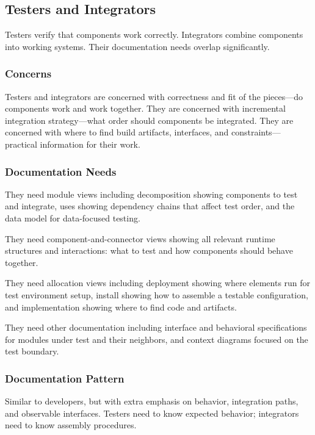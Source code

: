 \documentclass[11pt]{article}
\begin{document}
\subsection{Testers and Integrators}

Testers verify that components work correctly. Integrators combine components into working systems. Their documentation needs overlap significantly.

\subsubsection{Concerns}

Testers and integrators are concerned with correctness and fit of the pieces---do components work and work together. They are concerned with incremental integration strategy---what order should components be integrated. They are concerned with where to find build artifacts, interfaces, and constraints---practical information for their work.

\subsubsection{Documentation Needs}

They need module views including decomposition showing components to test and integrate, uses showing dependency chains that affect test order, and the data model for data-focused testing.

They need component-and-connector views showing all relevant runtime structures and interactions: what to test and how components should behave together.

They need allocation views including deployment showing where elements run for test environment setup, install showing how to assemble a testable configuration, and implementation showing where to find code and artifacts.

They need other documentation including interface and behavioral specifications for modules under test and their neighbors, and context diagrams focused on the test boundary.

\subsubsection{Documentation Pattern}

Similar to developers, but with extra emphasis on behavior, integration paths, and observable interfaces. Testers need to know expected behavior; integrators need to know assembly procedures.
\end{document}
